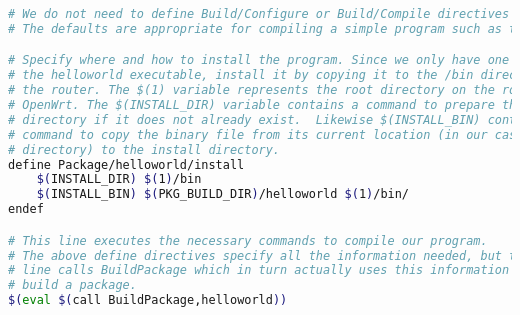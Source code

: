 \begin{lstlisting}[language=bash,basicstyle=\ttfamily\footnotesize,caption=Makefile for Helloworld.]
# We do not need to define Build/Configure or Build/Compile directives
# The defaults are appropriate for compiling a simple program such as this one

# Specify where and how to install the program. Since we only have one file,
# the helloworld executable, install it by copying it to the /bin directory on
# the router. The $(1) variable represents the root directory on the router running
# OpenWrt. The $(INSTALL_DIR) variable contains a command to prepare the install
# directory if it does not already exist.  Likewise $(INSTALL_BIN) contains the
# command to copy the binary file from its current location (in our case the build
# directory) to the install directory.
define Package/helloworld/install
	$(INSTALL_DIR) $(1)/bin
	$(INSTALL_BIN) $(PKG_BUILD_DIR)/helloworld $(1)/bin/
endef

# This line executes the necessary commands to compile our program.
# The above define directives specify all the information needed, but this
# line calls BuildPackage which in turn actually uses this information to
# build a package.
$(eval $(call BuildPackage,helloworld))
\end{lstlisting}
